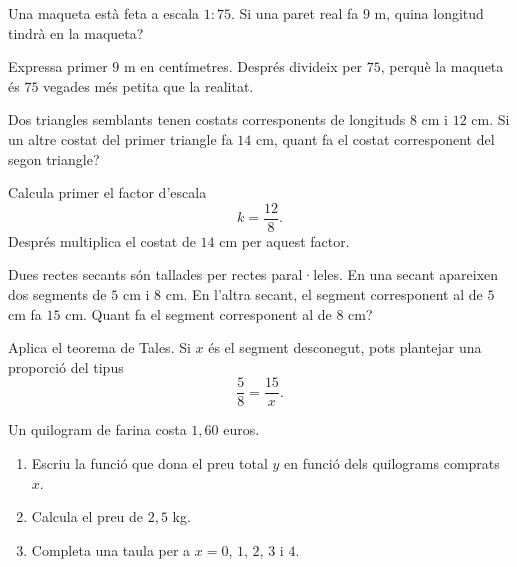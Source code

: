 \begin{exercici}[Maquetes]
	Una maqueta està feta a escala \(1:75\). Si una paret real fa \(9\) m, quina longitud tindrà en la maqueta?
\end{exercici}

\begin{indicacio}
	Expressa primer \(9\) m en centímetres. Després divideix per \(75\), perquè la maqueta és \(75\) vegades més petita que la realitat.
\end{indicacio}

\begin{exercici}
	Dos triangles semblants tenen costats corresponents de longituds \(8\) cm i \(12\) cm. Si un altre costat del primer triangle fa \(14\) cm, quant fa el costat corresponent del segon triangle?
\end{exercici}

\begin{indicacio}
	Calcula primer el factor d'escala
	\[
	k=\frac{12}{8}.
	\]
	Després multiplica el costat de \(14\) cm per aquest factor.
\end{indicacio}

\begin{exercici}
	Dues rectes secants són tallades per rectes paral·leles. En una secant apareixen dos segments de \(5\) cm i \(8\) cm. En l'altra secant, el segment corresponent al de \(5\) cm fa \(15\) cm. Quant fa el segment corresponent al de \(8\) cm?
\end{exercici}

\begin{indicacio}
	Aplica el teorema de Tales. Si \(x\) és el segment desconegut, pots plantejar una proporció del tipus
	\[
	\frac{5}{8}=\frac{15}{x}.
	\]
\end{indicacio}

\begin{exercici}
	Un quilogram de farina costa \(1{,}60\) euros.
	\begin{enumerate}[label=\alph*)]
		\item Escriu la funció que dona el preu total \(y\) en funció dels quilograms comprats \(x\).
		\item Calcula el preu de \(2{,}5\) kg.
		\item Completa una taula per a \(x=0\), \(1\), \(2\), \(3\) i \(4\).
	\end{enumerate}
\end{exercici}

